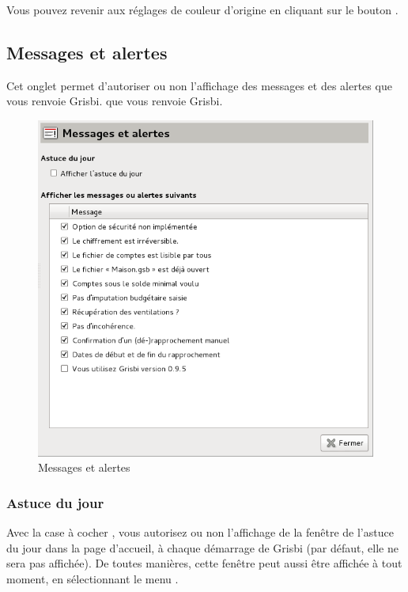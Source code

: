 Vous pouvez revenir aux réglages de couleur d'origine en cliquant sur le bouton .


\subsection{Messages et alertes\label{setup-display-messages}}

Cet onglet permet d'autoriser ou non l'affichage des messages et des alertes \ifIllustration que vous renvoie Grisbi.
\else que vous renvoie Grisbi.
\fi

\ifIllustration
\begin{figure}[h!]
\begin{center}
\includegraphics[scale=0.5]{image/screenshot/setup_messages_alerts}
\end{center}
\caption{Messages et alertes}
\label{setup-messages-alerts-img}
\end{figure}
\fi


\subsubsection{Astuce du jour\label{setup-display-messages-trick}}

Avec la case à cocher , vous autorisez ou non  l'affichage de la fenêtre de l'astuce du jour dans la page d'accueil, à chaque démarrage de Grisbi (par défaut, elle ne sera pas affichée). De toutes manières, cette fenêtre peut aussi être affichée à tout moment, en sélectionnant le menu .



